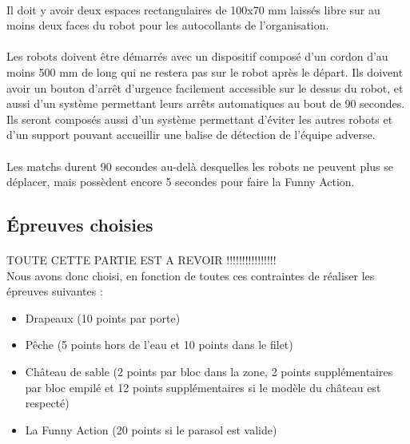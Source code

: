 \documentclass[12pt,a4paper]{article}
\begin{document}
\paragraph{}
Il doit y avoir deux espaces rectangulaires de 100x70 mm laissés libre sur au moins deux 
faces du robot pour les autocollants de l'organisation.

\paragraph{}
Les robots doivent être démarrés avec un dispositif composé d'un cordon d'au moins 500 mm de long qui ne
restera pas sur le robot après le départ. Ils doivent avoir un bouton d'arrêt d'urgence facilement accessible sur 
le dessus du robot, et aussi d'un système permettant leurs arrêts automatiques au bout de 90 secondes. Ils seront 
composés aussi d'un système permettant d'éviter les autres robots et d'un support pouvant accueillir une balise de détection de l'équipe adverse.

\paragraph{}
Les matchs durent 90 secondes au-delà desquelles les robots ne peuvent plus se déplacer, mais possèdent encore 5 
secondes pour faire la Funny Action. 

\subsection{Épreuves choisies}
\paragraph{}
TOUTE CETTE PARTIE EST A REVOIR !!!!!!!!!!!!!!!!\\ 
Nous avons donc choisi, en fonction de toutes ces contraintes de réaliser les épreuves suivantes : 
\begin{itemize}
\item Drapeaux (10 points par porte)
\item Pêche (5 points hors de l'eau et 10 points dans le filet)
\item Château de sable (2 points par bloc dans la zone, 2 points supplémentaires par bloc empilé et 12 points supplémentaires si le modèle du château est respecté)
\item La Funny Action (20 points si le parasol est valide)
\end{itemize}
\end{document}
